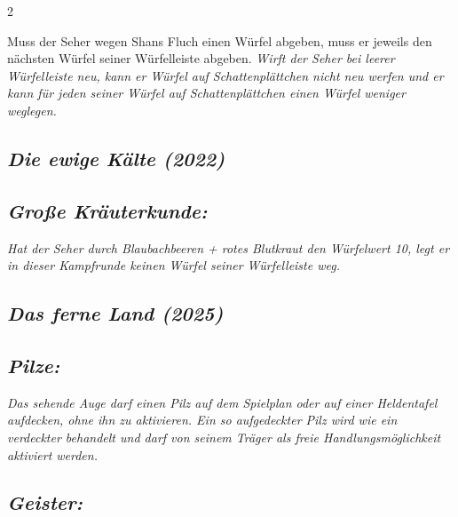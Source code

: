 \documentclass[10pt, a4paper, oneside]{book}
\newcommand{\fan}[1]{\textit{#1}}
\begin{document}
\begin{multicols*}{2}
\begin{bgcolor}[color-DZ]
Muss der Seher wegen Shans Fluch einen Würfel abgeben, muss er jeweils den nächsten Würfel seiner Würfelleiste abgeben.
\supercite{DZ:Begleitheft}
\fan{Wirft der Seher bei leerer Würfelleiste neu, kann er Würfel auf Schattenplättchen nicht neu werfen und er kann für jeden seiner Würfel auf Schattenplättchen einen Würfel weniger weglegen.}


\end{bgcolor}




\columnbreak



\begin{bgcolor}
\section{\fan{Die ewige Kälte (2022)}}





\subsection{\fan{Große Kräuterkunde:}}

\fan{Hat der Seher durch Blaubachbeeren + rotes Blutkraut den Würfelwert 10, legt er in dieser Kampfrunde keinen Würfel seiner Würfelleiste weg.}

\end{bgcolor}




\begin{bgcolor}
\section{\fan{Das ferne Land (2025)}}

\subsection{\fan{Pilze:}}


\fan{Das sehende Auge darf einen Pilz auf dem Spielplan oder auf einer Heldentafel aufdecken, ohne ihn zu aktivieren. Ein so aufgedeckter Pilz wird wie ein verdeckter behandelt und darf von seinem Träger als freie Handlungsmöglichkeit aktiviert werden.}







\subsection{\fan{Geister:}}


\end{bgcolor}
\end{multicols*}
\end{document}
